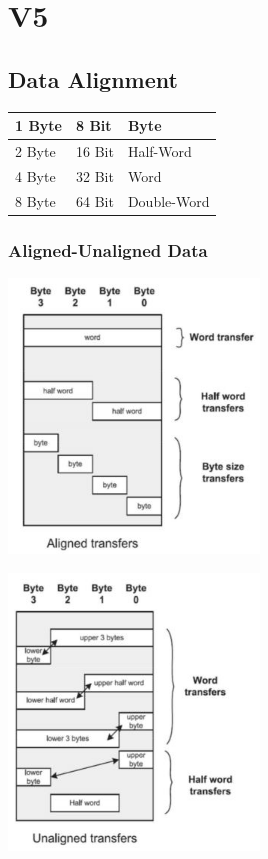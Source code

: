 \section{V5}
\subsection{Data Alignment}
\begin{tabular}{|l|l|l|}
    \hline 
    1 Byte & 8 Bit  & Byte  \\ 
    \hline 
    2 Byte & 16 Bit & Half-Word \\ 
    \hline 
    4 Byte & 32 Bit & Word \\ 
    \hline 
    8 Byte & 64 Bit & Double-Word \\ 
    \hline 
\end{tabular} 

\subsubsection{Aligned-Unaligned Data}
\begin{multicols}{2}
    \includegraphics[width=0.5\textwidth]{images/alignedData}
    
    \includegraphics[width=0.5\textwidth]{images/unalignedData}
\end{multicols}
    \clearpage
